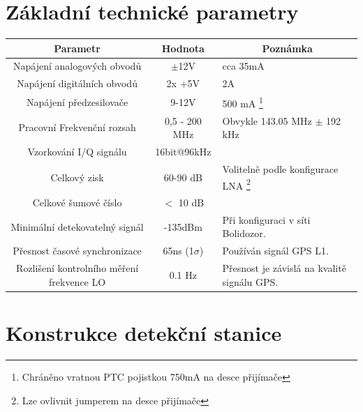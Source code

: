 \documentclass[12pt,a4paper,oneside]{article}
\begin{document}
\section{Základní technické parametry}
\begin{table}[htbp]
\begin{center}
\begin{tabular}{|c|c|p{5cm}|}
\hline
\multicolumn{1}{|c|}{Parametr} & \multicolumn{1}{|c|}{Hodnota} & \multicolumn{1}{|c|}{Poznámka} \\ \hline
Napájení analogových obvodů & $\pm$12V &  cca 35mA \\ \hline
Napájení digitálních obvodů & 2x +5V &  2A \\ \hline
Napájení předzesilovače  & 9-12V &  500 mA \footnote{Chráněno vratnou PTC pojistkou 750mA na desce přijímače} \\ \hline
Pracovní Frekvenční rozsah  & 0,5 - 200 MHz & Obvykle 143.05 MHz $\pm$ 192 kHz \\ \hline
Vzorkování I/Q signálu  & 16bit@96kHz & \\ \hline
Celkový zisk & 60-90 dB & Volitelně podle konfigurace LNA \footnote{Lze ovlivnit jumperem na desce přijímače}\\ \hline
Celkové šumové číslo & $<$ 10 dB & \\ \hline
Minimální detekovatelný signál & -135dBm  &  Při konfiguraci v síti Bolidozor.\\ \hline
Přesnost časové synchronizace &  65ns (1$\sigma$) &  Používán signál GPS L1.\\ \hline
Rozlišení kontrolního měření frekvence LO &  0.1 Hz &  Přesnost je závislá na kvalitě signálu GPS.\\ \hline
\end{tabular}
\end{center}
\end{table}

\newpage

\section{Konstrukce detekční stanice}
\end{document}
